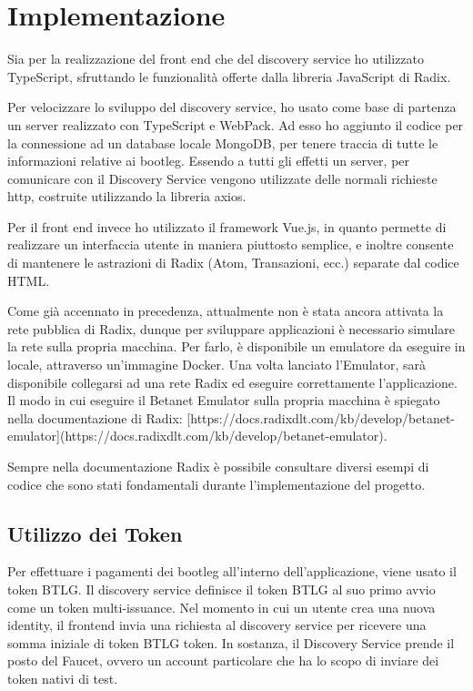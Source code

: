 \chapter{Implementazione}
Sia per la realizzazione del front end che del discovery service ho utilizzato TypeScript, sfruttando le funzionalità offerte dalla libreria JavaScript di Radix. 

Per velocizzare lo sviluppo del discovery service, ho usato come base di partenza un server realizzato con TypeScript e WebPack. Ad esso ho aggiunto il codice per la connessione ad un database locale MongoDB, per tenere traccia di tutte le informazioni relative ai bootleg. Essendo a tutti gli effetti un server, per comunicare con il Discovery Service vengono utilizzate delle normali richieste http, costruite utilizzando la libreria axios.

Per il front end invece ho utilizzato il framework Vue.js, in quanto permette di realizzare un interfaccia utente in maniera piuttosto semplice, e inoltre consente di mantenere le astrazioni di Radix (Atom, Transazioni, ecc.) separate dal codice HTML.

Come già accennato in precedenza, attualmente non è stata ancora attivata la rete pubblica di Radix, dunque per sviluppare applicazioni è necessario simulare la rete sulla propria macchina. Per farlo, è disponibile un emulatore da eseguire in locale, attraverso un'immagine Docker. Una volta lanciato l'Emulator, sarà disponibile collegarsi ad una rete Radix ed eseguire correttamente l'applicazione. Il modo in cui eseguire il Betanet Emulator sulla propria macchina è spiegato nella documentazione di Radix: [https://docs.radixdlt.com/kb/develop/betanet-emulator](https://docs.radixdlt.com/kb/develop/betanet-emulator). 

Sempre nella documentazione Radix è possibile consultare diversi esempi di codice che sono stati fondamentali durante l'implementazione del progetto.

\section{Utilizzo dei Token}

Per effettuare i pagamenti dei bootleg all'interno dell'applicazione, viene usato il token BTLG. Il discovery service definisce il token BTLG al suo primo avvio come un token multi-issuance. Nel momento in cui un utente crea una nuova identity, il frontend invia una richiesta al discovery service per ricevere una somma iniziale di token BTLG token. In sostanza, il Discovery Service prende il posto del Faucet, ovvero un account particolare che ha lo scopo di inviare dei token nativi di test. 

